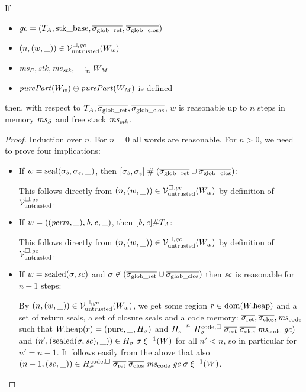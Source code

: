 \documentclass[a4paper]{article}
\begin{document}
\begin{lemma}
  \label{lem:untrusted-source-values-are-reasonable}
  If
  \begin{itemize}
  \item $\gc = (\ta,\stkb,\gsigrets,\gsigcloss)$
  \item $\npair{(w,\_)} \in \lrv(W_w)$
  \item $\memSat{\ms_S,\stk,\ms_\stk,\_}{W_M}$
  \item $\purePart{W_w} \oplus \purePart{W_M}$ is defined
  \end{itemize}
  then, with respect to $\ta,\gsigrets,\gsigcloss$, $w$ is reasonable up to $n$ steps in memory $\ms_S$ and free stack $\ms_\stk$.
\end{lemma}
\begin{proof}
  Induction over $n$.
  For $n=0$ all words are reasonable.
  For $n>0$, we need to prove four implications:
  \begin{itemize}
  \item If $w = \seal{\sigma_\baddr,\sigma_\eaddr,\_}$, then $[\sigma_\baddr,\sigma_\eaddr] \mathrel{\#} (\gsigrets \cup \gsigcloss)$:

    This follows directly from $\npair{(w,\_)} \in \lrv(W_w)$ by definition of $\lrv$.

  \item If $w = ((\perm,\_),\baddr,\eaddr,\_)$, then $[\baddr,\eaddr] \# \ta$:

    This follows directly from $\npair{(w,\_)} \in \lrv(W_w)$ by definition of $\lrv$.

  \item If $w = \sealed{\sigma,\vsc}$ and $\sigma \not\in (\gsigrets\cup \gsigcloss)$ then $\vsc$ is reasonable for $n-1$ steps:

    By $\npair{(w,\_)} \in \lrv(W_w)$, we get some region $r \in \dom(\pwheap)$ and a set of return seals, a set of closure seals and a code memory: $\sigrets,\sigcloss,\mscode$ such that $\pwheap(r) = (\pure,\_,H_\sigma)$ and $H_\sigma \nequal H^\mathrm{code,\square}_\sigma \; \sigrets \; \sigcloss \; \mscode \; \gc)$ and $\npair[n']{(\sealed{\sigma,\vsc},\_)} \in H_\sigma \; \sigma \; \xi^{-1}(W)$ for all $n' < n$, so in particular for $n' = n-1$.
    It follows easily from the above that also $\npair[n-1]{(\vsc,\_)} \in H^\mathrm{code,\square}_\sigma \; \sigrets \; \sigcloss \; \mscode \; \gc \; \sigma \; \xi^{-1}(W)$.


\end{itemize}
\end{proof}
\end{document}
